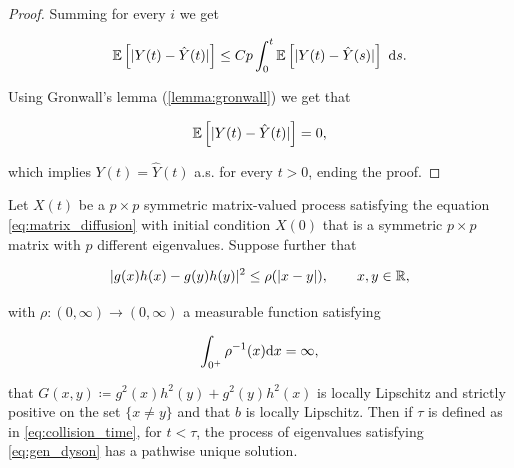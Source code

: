 \begin{proof}
    Summing for every $i$ we get

    \begin{equation*}
        \mathbb E \left[ \lvert Y(t) - \hat Y(t) \rvert \right] \le  Cp\int_0^t \mathbb E \left[ \lvert Y(t) - \hat Y(s) \rvert \right]~\mathrm d s.
    \end{equation*}

    Using Gronwall's lemma (\ref{lemma:gronwall}) we get that

    \begin{equation*}
        \mathbb E \left[ \lvert Y(t) - \hat Y(t) \rvert \right] = 0, 
    \end{equation*}

    \noindent which implies $Y(t) = \hat Y(t)$ a.s. for every $t>0$, ending the proof.
\end{proof}




\begin{theorem} \label{thm:spectral_yamadawatanabe}
    Let $X(t)$ be a $p\times p$ symmetric matrix-valued process satisfying the equation \eqref{eq:matrix_diffusion} with initial condition $X(0)$ that is a symmetric $p\times p$ matrix with $p$ different eigenvalues. Suppose further that

    \begin{equation}
        \lvert  g(x)h(x) - g(y)h(y)  \rvert^2 \le \rho(\lvert x-y \rvert), \qquad x,y \in \mathbb R,
    \end{equation}

    \noindent with $\rho:(0,\infty)\to(0,\infty)$ a measurable function satisfying

    \[ \int_{0^+} \rho^{-1}(x) \mathrm d x = \infty, \]

    \noindent that $G(x,y) \coloneqq g^2(x)h^2(y) + g^2(y)h^2(x)$ is locally Lipschitz and strictly positive on the set $\{ x \neq y\}$ and that $b$ is locally Lipschitz. Then if $\tau$ is defined as in \eqref{eq:collision_time}, for $t < \tau$, the process of eigenvalues satisfying \eqref{eq:gen_dyson} has a pathwise unique solution.
\end{theorem}

